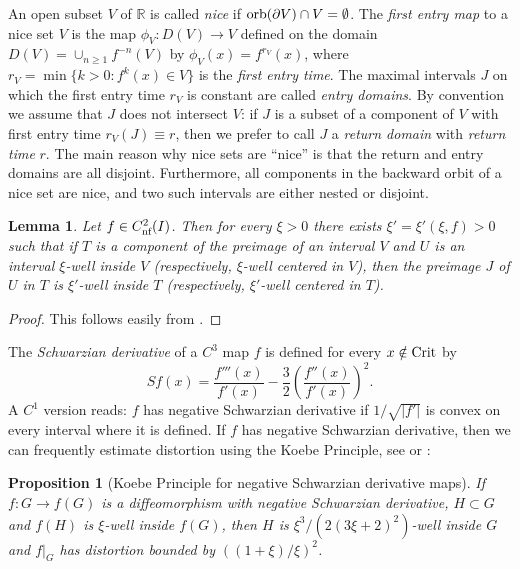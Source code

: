 \documentclass[12pt, psamsfonts, reqno]{amsart}
\newtheorem{proposition}[theorem]{Proposition}
\newtheorem{lemma}[theorem]{Lemma}
\begin{document}
An open subset $V$ of ${{\mathbb R}}$ is called \emph{nice} if ${\mathop{\rm orb}\nolimits}(\partial V)\cap
V=\emptyset$.
The \emph{first entry map} to a nice set $V$ is the
map $\phi_V:D(V)\rightarrow V$ defined on the domain $D(V) = \cup_{n \geq 1} f^{-n}(V)$
by $\phi_V(x)=f^{r_V}(x)$, where $r_V = \min\{ k > 0 : f^k(x) \in V\}$
is the \emph{first entry time}. The maximal intervals $J$ on which
the first entry time $r_V$ is constant are called \emph{entry
domains}. By convention we assume that $J$ does not intersect $V$:
if $J$ is a  subset of a component of $V$ with first entry time
$r_V(J) \equiv r$, then we prefer to call $J$ a \emph{return
domain} with \emph{return time} $r$. The main reason why nice sets
are ``nice'' is that the return and entry domains are all
disjoint. Furthermore, all components in the backward orbit of a
nice set are nice, and two such intervals are either nested or
disjoint.

\begin{lemma} \label{lem:regularity}
 Let $f\in {C^2_{\text{\rm nf}}}(I)$. Then for every $\xi>0$ there exists
    $\xi' = \xi'(\xi, f)>0$ such that if
    $T$ is a  component of the preimage of an interval $V$
    and $U$ is an interval $\xi$-well inside $V$
    (respectively, $\xi$-well centered in $V$), then the preimage
    $J$ of $U$ in $T$ is $\xi'$-well inside $T$
    (respectively, $\xi'$-well centered in $T$).
\end{lemma}

\begin{proof}
 This follows easily from \cite[Lemmas~3.2 and 3.3]{BlMi}.
\end{proof}

The \emph{Schwarzian derivative} of a $C^3$ map $f$ is defined
for every $x \notin {\mathop{\rm Crit}\nolimits}$ by
\[
Sf(x) = \frac{f'''(x)}{f'(x)} - \frac32\left(\frac{f''(x)}{f'(x)}\right)^2.
\]
A $C^1$ version reads: $f$ has negative Schwarzian derivative if
$1/\sqrt{|f'|}$ is convex on every interval where it is defined.
If $f$ has negative Schwarzian derivative, then we can frequently
estimate distortion using the Koebe Principle, see
 \cite[Section IV.1]{dMvS} or \cite[``Koebe lemma'']{BlMi}:

\begin{proposition}[Koebe Principle for negative Schwarzian derivative maps]
 \label{prop:koebenegative}
  If $f:G\rightarrow f(G)$ is a diffeomorphism with negative
  Schwarzian derivative, $H \subset G$ and $f(H)$ is
  $\xi$-well inside $f(G)$, then $H$ is $\xi^3/(2(3\xi+2)^2)$-well inside
  $G$ and $f|_G$ has distortion bounded by $((1+\xi)/\xi)^2$.
\end{proposition}
\end{document}
